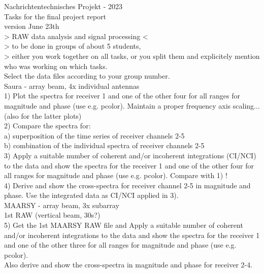 \begin{taskspec}
Nachrichtentechnisches Projekt - 2023\\

Tasks for the final project report\\
version June 23th\\

> RAW data analysis and signal processing <\\

> to be done in groups of about 5 students,\\
> either you work together on all tasks, or you split them and explicitely mention who was working on which tasks.\\


Select the data files according to your group number.\\

Saura - array beam, 4x individual antennas\\

1) Plot the spectra for receiver 1 and one of the other four for all ranges for magnitude and phase (use e.g. pcolor). Maintain a proper frequency axis scaling... (also for the latter plots)\\

2) Compare the spectra for:\\
a) superposition of the time series of receiver channels 2-5\\
b) combination of the individual spectra of receiver channels 2-5\\

3) Apply a suitable number of coherent and/or incoherent integrations (CI/NCI) to the data and show the spectra for the receiver 1 and one of the other four for all ranges for magnitude and phase (use e.g. pcolor). Compare with 1) !\\

4) Derive and show the cross-spectra for receiver channel 2-5 in magnitude and phase. Use the integrated data as CI/NCI applied in 3).\\


MAARSY - array beam, 3x subarray\\
1st RAW (vertical beam, 30s?)\\
5) Get the 1st MAARSY RAW file and Apply a suitable number of coherent and/or incoherent integrations to the data and show the spectra for the receiver 1 and one of the other three for all ranges for magnitude and phase (use e.g. pcolor).\\
Also derive and show the cross-spectra in magnitude and phase for receiver 2-4.\\


\end{taskspec}
